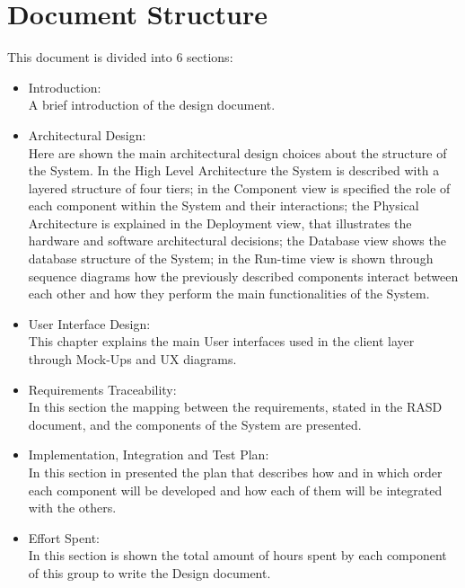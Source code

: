 \section{Document Structure}
This document is divided into 6 sections:

\begin{itemize}
\item Introduction:\\
A brief introduction of the design document.

\item Architectural Design:\\
Here are shown the main architectural design choices about the structure of the System. In the High Level Architecture the System is described with a layered structure of four tiers; in the Component view is specified the role of each component within the System and their interactions; the Physical Architecture is explained in the Deployment view, that illustrates the hardware and software architectural decisions; the Database view shows the database structure of the System; in the Run-time view is shown through sequence diagrams how the previously described components interact between each other and how they perform the main functionalities of the System.

\item User Interface Design:\\
This chapter explains the main User interfaces used in the client layer through Mock-Ups and UX diagrams.

\item Requirements Traceability:\\
In this section the mapping between the requirements, stated in the RASD document, and the components of the System are presented.

\item Implementation, Integration and Test Plan:\\
In this section in presented the plan that describes how and in which order each component will be developed and how each of them will be integrated with the others.

\item Effort Spent:\\
In this section is shown the total amount of hours spent by each component of this group to write the Design document.

\end{itemize}